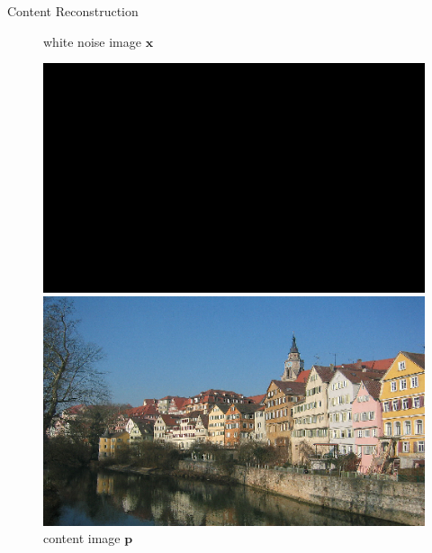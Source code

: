 \documentclass{beamer}
\begin{document}
\begin{frame}{Content Reconstruction}
\begin{figure}[ht]
    \begin{minipage}[b]{0.45\linewidth}
        \centering
        \caption*{white noise image $\mathbf{x}$}
        \includegraphics[width=\textwidth]{img/content/noise}
    \end{minipage}
    \hspace{0.5cm}
    \begin{minipage}[b]{0.45\linewidth}
        \centering
        \caption*{content image $\mathbf{p}$}
        \includegraphics[width=\textwidth]{img/content/tubingen}
    \end{minipage}
\end{figure}
\end{frame}
\end{document}
